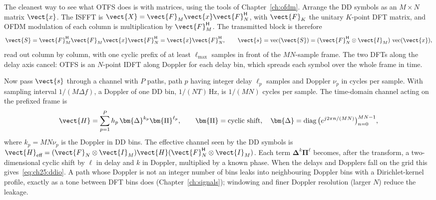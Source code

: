 \begin{deeper}
The cleanest way to see what OTFS does is with matrices, using the tools of Chapter~\ref{ch:ofdm}.
Arrange the DD symbols as an $M\times N$ matrix $\vect{x}$. The ISFFT is
$\vect{X}=\vect{F}_M\vect{x}\vect{F}_N^{\mathsf H}$, with $\vect{F}_K$ the unitary $K$-point DFT
matrix, and OFDM modulation of each column is multiplication by $\vect{F}_M^{\mathsf H}$. The
transmitted block is therefore
\begin{equation}
\vect{S}=\vect{F}_M^{\mathsf H}\vect{F}_M\vect{x}\vect{F}_N^{\mathsf H}=\vect{x}\vect{F}_N^{\mathsf H},
\qquad
\vect{s}=\operatorname{vec}(\vect{S})=(\vect{F}_N^{\mathsf H}\otimes\vect{I}_M)\,\operatorname{vec}(\vect{x}),
\label{eq:ch25:otfsvec}
\end{equation}
read out column by column, with one cyclic prefix of at least $\ell_{\max}$ samples in front of the
$MN$-sample frame. The two DFTs along the delay axis cancel: OTFS is an $N$-point IDFT along Doppler
for each delay bin, which spreads each symbol over the whole frame in time.

Now pass $\vect{s}$ through a channel with $P$ paths, path $p$ having integer delay $\ell_p$ samples and
Doppler $\nu_p$ in cycles per sample. With sampling interval $1/(M\Delta f)$, a Doppler of one DD bin,
$1/(NT)$\,Hz, is $1/(MN)$ cycles per sample. The time-domain channel acting on the prefixed frame is
\begin{equation}
\vect{H}=\sum_{p=1}^{P}h_p\,\bm{\Delta}^{k_p}\bm{\Pi}^{\ell_p},\qquad
\bm{\Pi}=\text{cyclic shift},\quad
\bm{\Delta}=\operatorname{diag}\big(e^{j2\pi n/(MN)}\big)_{n=0}^{MN-1},
\label{eq:ch25:hdd}
\end{equation}
where $k_p=MN\nu_p$ is the Doppler in DD bins. The effective channel seen by the DD symbols is
$\vect{H}_{\text{eff}}=(\vect{F}_N\otimes\vect{I}_M)\vect{H}(\vect{F}_N^{\mathsf H}\otimes\vect{I}_M)$.
Each term $\bm{\Delta}^{k}\bm{\Pi}^{\ell}$ becomes, after the transform, a two-dimensional cyclic
shift by $\ell$ in delay and $k$ in Doppler, multiplied by a known phase. When the delays and Dopplers
fall on the grid this gives~\eqref{eq:ch25:ddio}. A path whose Doppler is not an integer number of
bins leaks into neighbouring Doppler bins with a Dirichlet-kernel profile, exactly as a tone between
DFT bins does (Chapter~\ref{ch:signals}); windowing and finer Doppler resolution (larger $N$) reduce
the leakage.
\end{deeper}


